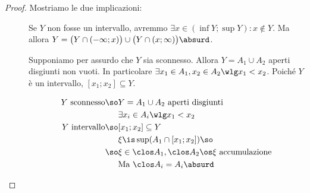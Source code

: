 \begin{proof}
	Mostriamo le due implicazioni:
	\begin{description}
		\item[\proofrightarrow]
			Se $Y$ non fosse un intervallo, avremmo
			$\exists x\in(\inf Y;\sup Y):x\not\in Y$.
			Ma allora $Y=\big(Y\cap(-\infty;x)\big)\cup\big(Y\cap(x;\infty)\big)\absurd$.
		\item[\proofleftarrow]
			Supponiamo per assurdo che $Y$ sia sconnesso.
			Allora $Y=A_1\cup A_2$ aperti disgiunti non vuoti.
			In particolare $\exists x_1\in A_1,x_2\in A_2\wlg x_1<x_2$.
			Poiché $Y$ è un intervallo, $[x_1;x_2]\subseteq Y$.
			
			\begin{align*}
				Y\text{ sconnesso}\so&Y=A_1\cup A_2\text{ aperti disgiunti}\\
				&\exists x_i\in A_i\wlg x_1<x_2\\
				Y\text{ intervallo}\so&[x_1;x_2]\subseteq Y\\
				&\xi\is\sup(A_1\cap[x_1;x_2])\so\\
				\so&\xi\in\clos A_1,\clos A_2\os\xi\text{ accumulazione}\\
				&\text{Ma }\clos A_i=A_i\absurd
			\end{align*}
	\end{description}
\end{proof}
